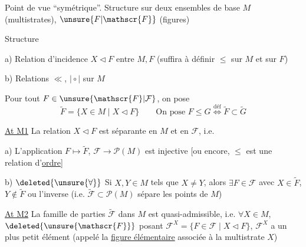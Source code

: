Point de vue ``symétrique''. Structure sur deux ensembles de base $M$ (multistrates), $\unsure{F|\mathscr{F}}$ (figures)

Structure\par
a) Relation d'incidence $X\triangleleft F$ entre $M,F$ (suffira à définir $\leq$ sur $M$ et sur $F$)

b) Relations $\ll$, $\mid\circ\mid$ sur $M$

Pour tout $F\in\unsure{\mathscr{F}|\mathcal{F}}$, on pose
\[
\widetilde{F}=\{X\in M\mid X\triangleleft F\}\qquad
\text{On pose }F\leq G\overset{\text{déf}}{\Longleftrightarrow}\widetilde{F}\subset\widetilde{G}
\]





\uline{At M1} La relation $X\triangleleft F$ est séparante en $M$ et en $\mathscr{F}$, i.e.

a) L'application $F\longmapsto\widetilde{F}$, $\mathscr{F}\longrightarrow\mathscr{P}(M)$ est injective [ou encore, $\leq$ est une relation d'\uline{ordre}]

b) $\deleted{\unsure{\forall}}$ Si $X,Y\in M$ tels que $X\neq Y$, alors $\exists F\in\mathscr{F}$ avec $X\in\widetilde{F}$, $Y\notin\widetilde{F}$ ou l'inverse (i.e. $\widetilde{\mathscr{F}}\subset\mathscr{P}(M)$ sépare les points de $M$)

\uline{At M2} La famille de parties $\widetilde{\mathscr{F}}$ dans $M$ est quasi-admissible, i.e. $\forall X\in M$, $\deleted{\unsure{\mathscr{F}}}$ posant $\mathscr{F}^{X}=\{F\in\mathscr{F}\mid X\triangleleft F\}$, $\mathscr{F}^{X}$ a un plus petit élément (appelé la \uline{figure élémentaire} associée à la multistrate $X$)

